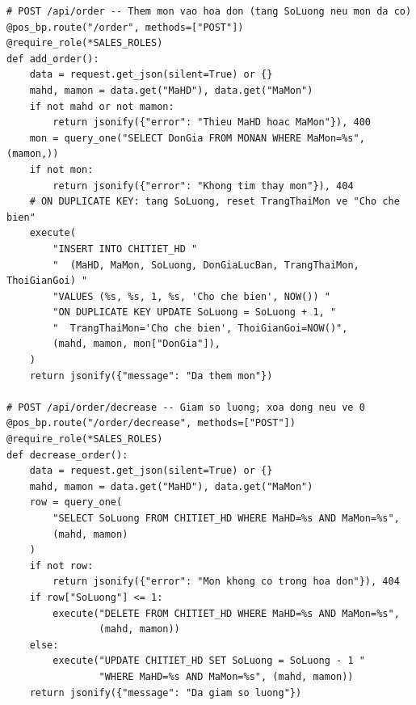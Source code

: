\documentclass[12pt,a4paper]{report}
\begin{document}
\begin{lstlisting}[style=mypython,
  caption={File \texttt{pos.py} -- Route gọi món: thêm và giảm số lượng món trong hóa đơn},
  label=lst:python-order]
# POST /api/order -- Them mon vao hoa don (tang SoLuong neu mon da co)
@pos_bp.route("/order", methods=["POST"])
@require_role(*SALES_ROLES)
def add_order():
    data = request.get_json(silent=True) or {}
    mahd, mamon = data.get("MaHD"), data.get("MaMon")
    if not mahd or not mamon:
        return jsonify({"error": "Thieu MaHD hoac MaMon"}), 400
    mon = query_one("SELECT DonGia FROM MONAN WHERE MaMon=%s", (mamon,))
    if not mon:
        return jsonify({"error": "Khong tim thay mon"}), 404
    # ON DUPLICATE KEY: tang SoLuong, reset TrangThaiMon ve "Cho che bien"
    execute(
        "INSERT INTO CHITIET_HD "
        "  (MaHD, MaMon, SoLuong, DonGiaLucBan, TrangThaiMon, ThoiGianGoi) "
        "VALUES (%s, %s, 1, %s, 'Cho che bien', NOW()) "
        "ON DUPLICATE KEY UPDATE SoLuong = SoLuong + 1, "
        "  TrangThaiMon='Cho che bien', ThoiGianGoi=NOW()",
        (mahd, mamon, mon["DonGia"]),
    )
    return jsonify({"message": "Da them mon"})

# POST /api/order/decrease -- Giam so luong; xoa dong neu ve 0
@pos_bp.route("/order/decrease", methods=["POST"])
@require_role(*SALES_ROLES)
def decrease_order():
    data = request.get_json(silent=True) or {}
    mahd, mamon = data.get("MaHD"), data.get("MaMon")
    row = query_one(
        "SELECT SoLuong FROM CHITIET_HD WHERE MaHD=%s AND MaMon=%s",
        (mahd, mamon)
    )
    if not row:
        return jsonify({"error": "Mon khong co trong hoa don"}), 404
    if row["SoLuong"] <= 1:
        execute("DELETE FROM CHITIET_HD WHERE MaHD=%s AND MaMon=%s",
                (mahd, mamon))
    else:
        execute("UPDATE CHITIET_HD SET SoLuong = SoLuong - 1 "
                "WHERE MaHD=%s AND MaMon=%s", (mahd, mamon))
    return jsonify({"message": "Da giam so luong"})
\end{lstlisting}
\end{document}
